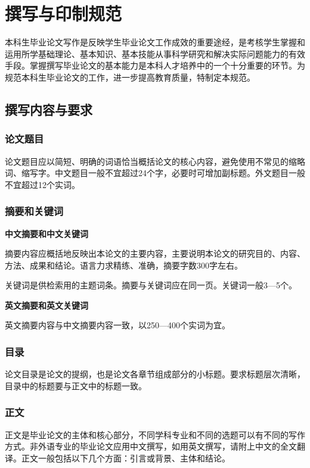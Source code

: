 \section{撰写与印制规范}
\setcounter{figure}{0}
\setcounter{table}{0}

本科生毕业论文写作是反映学生毕业论文工作成效的重要途经，是考核学生掌握和运用所学基础理论、基本知识、基本技能从事科学研究和解决实际问题能力的有效手段。掌握撰写毕业论文的基本能力是本科人才培养中的一个十分重要的环节。为规范本科生毕业论文的工作，进一步提高教育质量，特制定本规范。

\subsection{撰写内容与要求}

\subsubsection{论文题目}

论文题目应以简短、明确的词语恰当概括论文的核心内容，避免使用不常见的缩略词、缩写字。中文题目一般不宜超过24个字，必要时可增加副标题。外文题目一般不宜超过12个实词。

\subsubsection{摘要和关键词}

\textbf{中文摘要和中文关键词}

摘要内容应概括地反映出本论文的主要内容，主要说明本论文的研究目的、内容、方法、成果和结论。语言力求精练、准确，摘要字数300字左右。

关键词是供检索用的主题词条。摘要与关键词应在同一页。关键词一般3—5个。

\textbf{英文摘要和英文关键词}

英文摘要内容与中文摘要内容一致，以250—400个实词为宜。

\subsubsection{目录}

论文目录是论文的提纲，也是论文各章节组成部分的小标题。要求标题层次清晰，目录中的标题要与正文中的标题一致。

\subsubsection{正文}

正文是毕业论文的主体和核心部分，不同学科专业和不同的选题可以有不同的写作方式。非外语专业的毕业论文应用中文撰写，如用英文撰写，请附上中文的全文翻译。正文一般包括以下几个方面：引言或背景、主体和结论。

